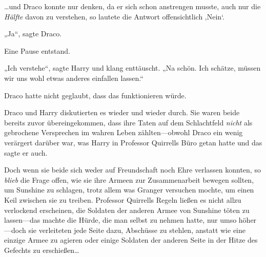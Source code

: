 …und Draco konnte nur denken, da er sich schon anstrengen musste, auch nur die \emph{Hälfte} davon zu verstehen, so lautete die Antwort offensichtlich ‚Nein‘.

„Ja“, sagte Draco.

Eine Pause entstand.

„Ich verstehe“, sagte Harry und klang enttäuscht. „Na schön. Ich schätze, müssen wir uns wohl etwas anderes einfallen lassen.“

Draco hatte nicht geglaubt, dass das funktionieren würde.

Draco und Harry diskutierten es wieder und wieder durch. Sie waren beide bereits zuvor übereingekommen, dass ihre Taten auf dem Schlachtfeld \emph{nicht} als gebrochene Versprechen im wahren Leben zählten—obwohl Draco ein wenig verärgert darüber war, was Harry in Professor Quirrells Büro getan hatte und das sagte er auch.

Doch wenn sie beide sich weder auf Freundschaft noch Ehre verlassen konnten, so \emph{blieb} die Frage offen, wie sie ihre Armeen zur Zusammenarbeit bewegen sollten, um Sunshine zu schlagen, trotz allem was Granger versuchen mochte, um einen Keil zwischen sie zu treiben. Professor Quirrells Regeln ließen es nicht allzu verlockend erscheinen, die Soldaten der anderen Armee von Sunshine töten zu lassen—das machte die Hürde, die man selbst zu nehmen hatte, nur umso höher—doch sie verleiteten jede Seite dazu, Abschüsse zu stehlen, anstatt wie eine einzige Armee zu agieren oder einige Soldaten der anderen Seite in der Hitze des Gefechts zu erschießen…

